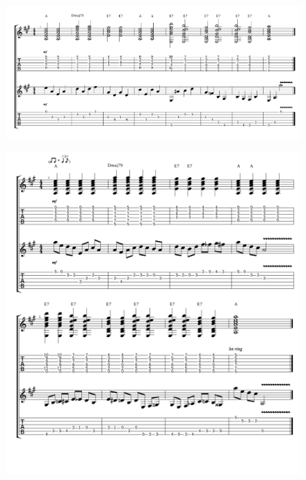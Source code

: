 \begin{figure}[!htbp]
 \advance\leftskip-6mm
 \includegraphics[page=1,scale=0.70]{notes/dallamszerkesztes.pdf}
 \label{fig:notevertical}
\end{figure}

\begin{figure}[!htbp]
 \advance\leftskip-6mm
 \includegraphics[page=1,scale=0.85]{notes/dallamszerkesztes_II.pdf}
 \label{fig:noteenharmonic}
\end{figure}
